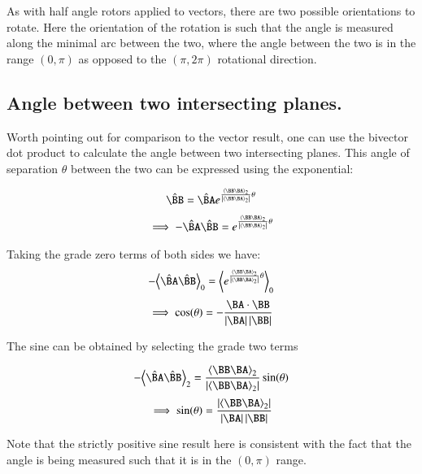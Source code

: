 As with half angle rotors applied to vectors, there are two possible orientations to rotate.  Here the orientation of the rotation is such that the angle is measured along the minimal arc between the two, where the angle between the two is in the range $(0,\pi)$ as opposed to the $(\pi,2\pi)$ rotational direction.

\subsection{Angle between two intersecting planes. }

Worth pointing out for comparison to the vector result, one can use the bivector dot product to calculate the angle between two intersecting planes.  This angle of separation $\theta$ between the two can be expressed using the exponential:

\begin{align*}
\hat{\BB} = \hat{\BA} e^{ \frac{\gpgradetwo{\BB \BA}}{\Abs{\gpgradetwo{\BB \BA}}} \theta}
\end{align*}
\begin{align*}
\implies
-\hat{\BA} \hat{\BB} = e^{ \frac{\gpgradetwo{\BB \BA}}{\Abs{\gpgradetwo{\BB \BA}}} \theta}
\end{align*}

Taking the grade zero terms of both sides we have:
\begin{align*}
-\gpgradezero{\hat{\BA} \hat{\BB}} = \gpgradezero{ e^{ \frac{\gpgradetwo{\BB \BA}}{\Abs{\gpgradetwo{\BB \BA}}} \theta} }
\end{align*}
\begin{align*}
\implies
\cos(\theta) = - \frac{\BA \cdot \BB}{\Abs{\BA}\Abs{\BB}}
\end{align*}

The sine can be obtained by selecting the grade two terms

\begin{align*}
-\gpgradetwo{\hat{\BA} \hat{\BB}} = \frac{\gpgradetwo{\BB \BA}}{\Abs{\gpgradetwo{\BB \BA}}} \sin(\theta)
\end{align*}
\begin{align*}
\implies
\sin(\theta) = \frac{\Abs{\gpgradetwo{\BB \BA}}}{ \Abs{\BA}\Abs{\BB} }
\end{align*}

Note that the strictly positive sine result here is consistent with the fact that the angle is being measured such that it is in the
$(0,\pi)$ range.

